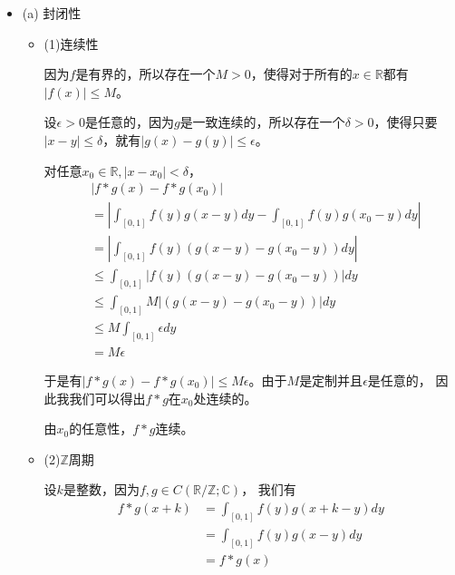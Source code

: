 \documentclass{article}
\begin{document}
\begin{itemize}
  \item (a) 封闭性

        \begin{itemize}
          \item (1)连续性

                因为$f$是有界的，所以存在一个$M > 0$，使得对于所有的$x \in \mathbb{R}$都有$|f(x)| \leq M$。

                设$\epsilon > 0$是任意的，因为$g$是一致连续的，所以存在一个$\delta > 0$，使得只要
                $|x - y| \leq \delta$，就有$|g(x) - g(y)| \leq \epsilon$。


                对任意$x_0 \in \mathbb{R}, |x - x_0| < \delta$，
                \begin{align*}
                   & |f \ast g(x) - f \ast g(x_0)|                                                    \\
                   & = \left|\int_{[0, 1]} f(y) g(x - y) dy - \int_{[0, 1]} f(y) g(x_0 - y) dy\right| \\
                   & = \left|\int_{[0, 1]} f(y) (g(x - y) - g(x_0 - y)) dy \right|                    \\
                   & \leq \int_{[0, 1]} |f(y) (g(x - y) - g(x_0 - y))| dy                             \\
                   & \leq \int_{[0, 1]} M|(g(x - y) - g(x_0 - y))| dy                                 \\
                   & \leq M \int_{[0, 1]} \epsilon dy                                                 \\
                   & = M \epsilon
                \end{align*}

                于是有$|f \ast g(x) - f \ast g(x_0)| \leq M \epsilon$。由于$M$是定制并且$\epsilon$是任意的，
                因此我我们可以得出$f \ast g$在$x_0$处连续的。

                由$x_0$的任意性，$f \ast g$连续。
          \item (2)$\mathbb{Z}$周期

                设$k$是整数，因为$f, g \in C(\mathbb{R}/\mathbb{Z}; \mathbb{C})$，
                我们有
                \begin{align*}
                  f \ast  g(x + k) & = \int_{[0, 1]} f(y) g(x+k - y) dy \\
                                   & = \int_{[0, 1]} f(y) g(x - y) dy   \\
                                   & = f \ast g(x)
                \end{align*}


\end{itemize}
\end{itemize}
\end{document}
